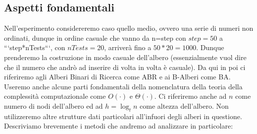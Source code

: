 \subsection{Aspetti fondamentali}
\label{sec:AspettiFondamentali_1}
Nell'esperimento considereremo caso quello medio, ovvero una serie di numeri non ordinati, dunque in ordine casuale che vanno da n=step con $step=50$ a ```step*nTests```, con $nTests=20$, arriverà fino a $50*20=1000$. Dunque prenderemo la costruzione in modo casuale dell'albero (essenzialmente vuol dire che il numero che andrò ad inserire di volta in volta è casuale). Da qui in poi ci riferiremo agli Alberi Binari di Ricerca come ABR e ai B-Alberi come BA. Useremo anche alcune parti fondamentali della nomenclatura della teoria della complessità computazionale come $O(\cdot)$ e $\Theta(\cdot)$. Ci riferiremo anche ad $n$ come numero di nodi dell'albero ed ad $h = \log _t n$ come altezza dell'albero. Non utilizzeremo altre strutture dati particolari all'infuori degli alberi in questione. Descriviamo brevemente i metodi che andremo ad analizzare in particolare:
